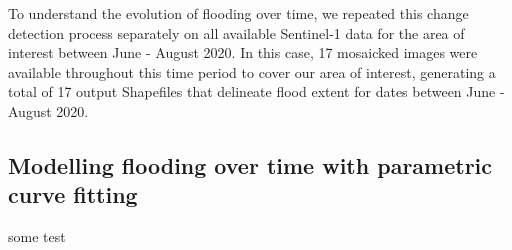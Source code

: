 \documentclass[
]{article}
\begin{document}
To understand the evolution of flooding over time, we repeated this
change detection process separately on all available Sentinel-1 data for
the area of interest between June - August 2020. In this case, 17
mosaicked images were available throughout this time period to cover our
area of interest, generating a total of 17 output Shapefiles that
delineate flood extent for dates between June - August 2020.

\hypertarget{modelling-flooding-over-time-with-parametric-curve-fitting}{%
\subsection{Modelling flooding over time with parametric curve
fitting}\label{modelling-flooding-over-time-with-parametric-curve-fitting}}

some test
\end{document}
